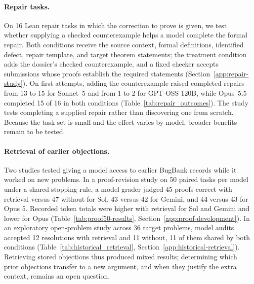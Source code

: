 \paragraph{Repair tasks.}
On 16 Lean repair tasks in which the correction to prove is given, we test whether supplying a checked counterexample helps a model complete the formal repair. Both conditions receive the source context, formal definitions, identified defect, repair template, and target theorem statements; the treatment condition adds the dossier's checked counterexample, and a fixed checker accepts submissions whose proofs establish the required statements (Section~\ref{app:repair-study}). On first attempts, adding the counterexample raised completed repairs from 13 to 15 for Sonnet~5 and from 1 to 2 for GPT-OSS 120B, while Opus~5.5 completed 15 of 16 in both conditions (Table~\ref{tab:repair_outcomes}). The study tests completing a supplied repair rather than discovering one from scratch. Because the task set is small and the effect varies by model, broader benefits remain to be tested.

\paragraph{Retrieval of earlier objections.}
Two studies tested giving a model access to earlier BugBank records while it worked on new problems. In a proof-revision study on 50 paired tasks per model under a shared stopping rule, a model grader judged 45 proofs correct with retrieval versus 47 without for Sol, 43 versus 42 for Gemini, and 44 versus 43 for Opus 5. Recorded token totals were higher with retrieval for Sol and Gemini and lower for Opus (Table~\ref{tab:proof50-results}, Section~\ref{app:proof-development}). In an exploratory open-problem study across 36 target problems, model audits accepted 12 resolutions with retrieval and 11 without, 11 of them shared by both conditions (Table~\ref{tab:historical_retrieval}, Section~\ref{app:historical-retrieval}). Retrieving stored objections thus produced mixed results; determining which prior objections transfer to a new argument, and when they justify the extra context, remains an open question.
